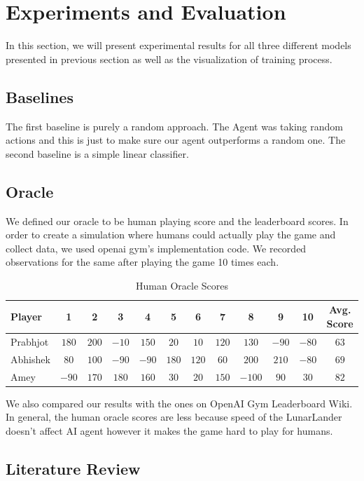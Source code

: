 \section{Experiments and Evaluation}
In this section, we will present experimental results for all three different models presented in previous section as well as the visualization of training process.

\subsection{ Baselines}
The first baseline is purely a random approach. The Agent was taking random actions and this is just to make sure our agent outperforms a random one. 
The second baseline is a simple linear classifier.

\subsection{Oracle}

We defined our oracle to be human playing score and the leaderboard scores. In order to create a simulation where humans could actually play the game and collect data, we used openai gym's implementation code. We recorded observations for the same after playing the game 10 times each. \\

\label{sec:exp}
\begin{table}%
\centering
\begin{tabular}{|l|c|c|c|c|c|c|c|c|c|c|c|}
\hline
Player & 1 & 2 & 3 & 4 & 5 & 6 & 7 & 8 & 9 & 10  & Avg. Score \\
\hline
Prabhjot & $180$ & $200$ & $-10$ &  $150$ & $20$ & $10$ & $120$ & $130$ & $-90$ &  $-80$  & $63$ \\
\hline
Abhishek & $80$ & $100$ & $-90$ &  $-90$ & $180$ & $120$ & $60$ & $200$ & $210$ &  $-80$  & $69$ \\
\hline
Amey & $-90$ & $170$ & $180$ &  $160$ & $30$ & $20$ & $150$ & $-100$ & $90$ &  $30$ & $82$   \\
\hline
\end{tabular}
\caption{Human Oracle Scores}
\label{tab:accuracy}
\end{table}
We also compared our results with the ones on OpenAI Gym Leaderboard Wiki. In general, the human oracle scores are less because speed of the LunarLander doesn't affect AI agent however it makes the game hard to play for humans.


\subsection{Literature Review}

